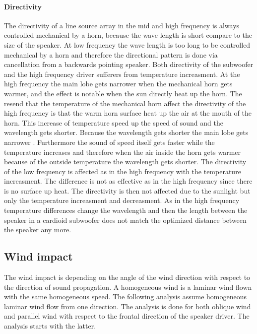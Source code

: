 \paragraph{Directivity} The directivity of a line source array in the mid and high frequency is always controlled mechanical by a horn, because the wave length is short compare to the size of the speaker. At low frequency the wave length is too long to be controlled mechanical by a horn and therefore the directional pattern is done via cancellation from a backwards pointing speaker. Both directivity of the subwoofer and the high frequency driver sufferers from temperature increasment. At the high frequency the main lobe gets narrower when the mechanical horn gets warmer, and the effect is notable when the sun directly heat up the horn. The resend that the temperature of the mechanical horn affect the directivity of the high frequency is that the warm horn surface heat up the air at the mouth of the horn. This increase of temperature speed up the speed of sound and the wavelength gets shorter. Because the wavelength gets shorter the main lobe gets narrower \citep{levine2018influence}. Furthermore the sound of speed itself gets faster while the temperature increases and therefore when the air inside the horn gets warmer because of the outside temperature the wavelength gets shorter. The directivity of the low frequency is affected as in the high frequency with the temperature increasment. The difference is not as effective as in the high frequency since there is no surface up heat. The directivity is then not affected due to the sunlight but only the temperature increasment and decreasment. As in the high frequency temperature differences change the wavelength and then the length between the speaker in a cardioid subwoofer does not match the optimized distance between the speaker any more.  



\subsection{Wind impact}
The wind impact is depending on the angle of the wind direction with respect to the direction of sound propagation. A homogeneous wind is a laminar wind flown with the same homogeneous speed. The following analysis assume homogeneous laminar wind flow from one direction. The analysis is done for both oblique wind and parallel wind with respect to the frontal direction of the speaker driver. The analysis starts with the latter. 


